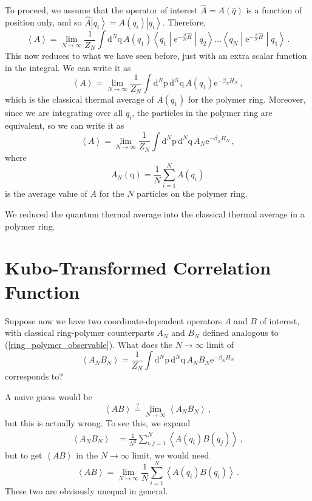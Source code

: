\documentclass{article}
\theoremstyle{plain}\theoremheaderfont{\normalfont\itshape}\theorembodyfont{\rmfamily}\theoremseparator{.}\newtheorem*{rem}{Remark}\newtheorem*{ex}{Example}\newtheorem*{proof}{Proof}\newtheorem*{altp}{Alternative proof}
\theoremstyle{plain}\theoremheaderfont{\normalfont\bfseries}\theorembodyfont{\rmfamily}\theoremseparator{.}\newtheorem{thm}{Theorem}[section]\newtheorem{lem}[thm]{Lemma}\newtheorem{prop}[thm]{Proposition}\newtheorem*{cor}{Corollary}\newtheorem{defn}[thm]{Definition}\newtheorem{clm}[thm]{Claim}\newtheorem{clminproof}{Claim}
\theoremstyle{break}\theoremheaderfont{\normalfont\itshape}\theorembodyfont{\rmfamily}\theoremseparator{.\medskip}\newtheorem*{proofskip}{Proof}\newtheorem*{exs}{Examples}\newtheorem*{rems}{Remarks}
\theoremstyle{break}\theoremheaderfont{\normalfont\bfseries}\theorembodyfont{\rmfamily}\theoremseparator{.\medskip}\newtheorem{lemskip}[thm]{Lemma}\newtheorem{defnskip}[thm]{Definition}\newtheorem{propskip}[thm]{Proposition}\newtheorem{thmskip}[thm]{Theorem}
\numberwithin{equation}{section}
\newcommand{\ee}{\mathrm{e}}
\newcommand{\dd}[2][]{\mathrm{d}^{#1} #2\,}
\newcommand{\ket}[1]{\left| #1 \right\rangle}
\newcommand{\mel}[3]{\left\langle #1 \middle| #2 \middle| #3 \right\rangle}
\newcommand{\eval}[1]{\left\langle #1 \right\rangle}
\newcommand{\vb}[1]{\bm{\mathrm{#1}}}
\begin{document}
    To proceed, we assume that the operator of interest \(\hat{A}=A(\hat{q})\) is a function of position only, and so \(\hat{A}\ket{q_i}=A(q_i)\ket{q_i}\). Therefore,
    \begin{equation}
        \eval{A}=\lim_{N\to\infty}\frac{1}{Z_N}\int\dd[N]{\vb{q}}A(q_1)\mel{q_1}{\ee^{-\frac{\beta}{N}\hat{H}}}{q_2}\dots\mel{q_N}{\ee^{-\frac{\beta}{N}\hat{H}}}{q_1}\,.
    \end{equation}
    This now reduces to what we have seen before, just with an extra scalar function in the integral. We can write it as
    \begin{equation}
        \eval{A}=\lim_{N\to\infty}\frac{1}{Z_N}\int\dd[N]{\vb{p}}\dd[N]{\vb{q}} A(q_1)\ee^{-\beta_N H_N}\,,
    \end{equation}
    which is the classical thermal average of \(A(q_1)\) for the polymer ring. Moreover, since we are integrating over all \(q_i\), the particles in the polymer ring are equivalent, so we can write it as
    \begin{equation}
        \eval{A}=\lim_{N\to\infty}\frac{1}{Z_N}\int\dd[N]{\vb{p}}\dd[N]{\vb{q}} A_N\ee^{-\beta_N H_N}\,,
    \end{equation}
    where
    \begin{equation}\label{ring_polymer_observable}
        A_N(\vb{q})=\frac{1}{N}\sum_{i=1}^{N}A(q_i)
    \end{equation}
    is the average value of \(A\) for the \(N\) particles on the polymer ring.

    We reduced the quantum thermal average into the classical thermal average in a polymer ring.

    \newpage
    \section{Kubo-Transformed Correlation Function}
    Suppose now we have two coordinate-dependent operators \(A\) and \(B\) of interest, with classical ring-polymer counterparts \(A_N\) and \(B_N\) defined analogous to (\ref{ring_polymer_observable}). What does the \(N\to\infty\) limit of
    \begin{equation}
        \eval{A_N B_N}=\frac{1}{Z_N}\int\dd[N]{\vb{p}}\dd[N]{\vb{q}}A_N B_N \ee^{-\beta_N H_N}
    \end{equation}
    corresponds to?

    A naive guess would be
    \begin{equation}
        \eval{AB}\stackrel{?}{=}\lim_{N\to\infty}\eval{A_N B_N}\,,
    \end{equation}
    but this is actually wrong. To see this, we expand
    \begin{align}
        \eval{A_N B_N}&=\frac{1}{N^2}\sum_{i,j=1}^{N}\eval{A(q_i)B(q_j)}\,,
    \end{align}
    but to get \(\eval{AB}\) in the \(N\to\infty\) limit, we would need
    \begin{equation}
        \eval{AB}=\lim_{N\to\infty}\frac{1}{N}\sum_{i=1}^{N}\eval{A(q_i)B(q_i)}\,.
    \end{equation}
    These two are obviously unequal in general.
\end{document}
